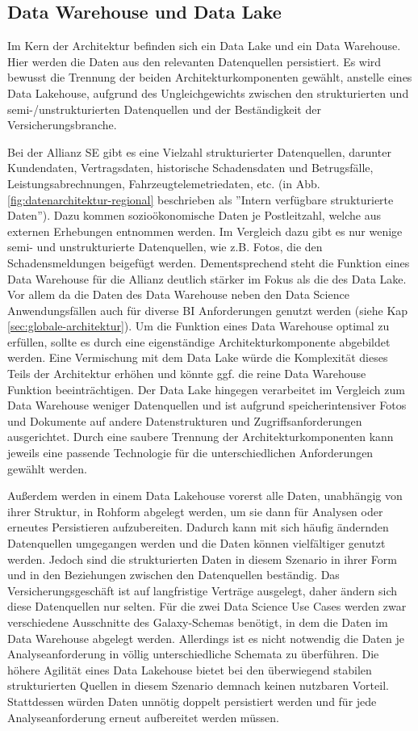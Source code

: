 \subsection{Data Warehouse und Data Lake}

Im Kern der Architektur befinden sich ein Data Lake
und ein Data Warehouse.
Hier werden die Daten aus den relevanten Datenquellen persistiert.
Es wird bewusst die Trennung der beiden Architekturkomponenten gewählt,
anstelle eines Data Lakehouse,
aufgrund des Ungleichgewichts zwischen den strukturierten 
und semi-/unstrukturierten Datenquellen 
und der Beständigkeit der Versicherungsbranche.

Bei der Allianz SE gibt es eine Vielzahl strukturierter Datenquellen,
darunter Kundendaten, Vertragsdaten, historische Schadensdaten und Betrugsfälle, 
Leistungsabrechnungen, Fahrzeugtelemetriedaten, etc. 
(in Abb. \ref{fig:datenarchitektur-regional} beschrieben als ''Intern verfügbare strukturierte Daten'').
Dazu kommen sozioökonomische Daten je Postleitzahl, 
welche aus externen Erhebungen entnommen werden.
Im Vergleich dazu gibt es nur wenige semi- und
unstrukturierte Datenquellen, wie z.B. Fotos, 
die den Schadensmeldungen beigefügt werden.
Dementsprechend steht die Funktion eines Data Warehouse
für die Allianz deutlich stärker im Fokus als die des Data Lake.
Vor allem da die Daten des Data Warehouse neben den Data Science Anwendungsfällen
auch für diverse BI Anforderungen genutzt werden (siehe Kap \ref{sec:globale-architektur}).
Um die Funktion eines Data Warehouse optimal zu erfüllen,
sollte es durch eine eigenständige Architekturkomponente
abgebildet werden.
Eine Vermischung mit dem Data Lake würde die Komplexität 
dieses Teils der Architektur erhöhen und könnte ggf. 
die reine Data Warehouse Funktion beeinträchtigen.
Der Data Lake hingegen verarbeitet im Vergleich zum Data
Warehouse weniger Datenquellen und ist aufgrund speicherintensiver Fotos und
Dokumente auf andere Datenstrukturen und Zugriffsanforderungen ausgerichtet.
Durch eine saubere Trennung der Architekturkomponenten
kann jeweils eine passende Technologie für die unterschiedlichen
Anforderungen gewählt werden.

Außerdem werden in einem Data Lakehouse vorerst alle Daten,
unabhängig von ihrer Struktur,
in Rohform abgelegt werden, um sie dann für Analysen
oder erneutes Persistieren aufzubereiten.
Dadurch kann mit sich häufig ändernden Datenquellen umgegangen werden
und die Daten können vielfältiger genutzt werden.
Jedoch sind die strukturierten Daten in diesem Szenario 
in ihrer Form und in den Beziehungen 
zwischen den Datenquellen beständig.
Das Versicherungsgeschäft ist auf langfristige Verträge ausgelegt,
daher ändern sich diese Datenquellen nur selten.
Für die zwei Data Science Use Cases werden zwar
verschiedene Ausschnitte des Galaxy-Schemas benötigt,
in dem die Daten im Data Warehouse abgelegt werden.
Allerdings ist es nicht notwendig die Daten je Analyseanforderung 
in völlig unterschiedliche Schemata zu überführen. 
Die höhere Agilität eines Data Lakehouse bietet bei den
überwiegend stabilen strukturierten Quellen in diesem Szenario demnach keinen nutzbaren Vorteil.
Stattdessen würden Daten unnötig doppelt persistiert werden
und für jede Analyseanforderung erneut aufbereitet werden müssen.

